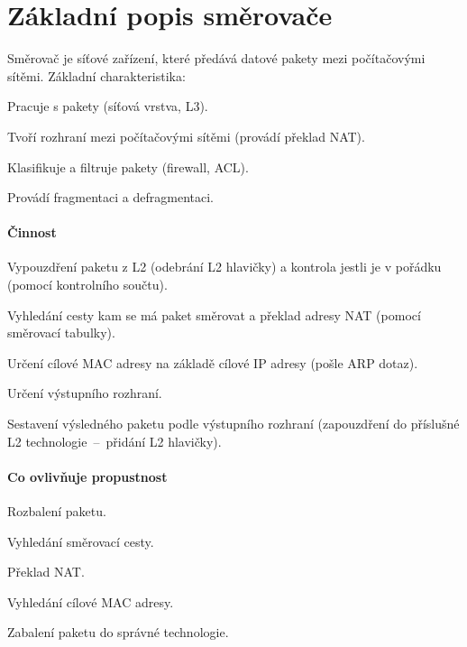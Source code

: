 
\section{Základní popis směrovače}

Směrovač je síťové zařízení, které předává datové pakety mezi počítačovými sítěmi. Základní charakteristika: \begin{compactitem}
    \item Pracuje s pakety (síťová vrstva, L3).
    \item Tvoří rozhraní mezi počítačovými sítěmi (provádí překlad NAT).
    \item Klasifikuje a filtruje pakety (firewall, ACL).
    \item Provádí fragmentaci a defragmentaci.
\end{compactitem}

\paragraph*{Činnost} \begin{compactenum}
    \item Vypouzdření paketu z L2 (odebrání L2 hlavičky) a kontrola jestli je v pořádku (pomocí kontrolního součtu).
    \item Vyhledání cesty kam se má paket směrovat a překlad adresy NAT (pomocí směrovací tabulky).
    \item Určení cílové MAC adresy na základě cílové IP adresy (pošle ARP dotaz).
    \item Určení výstupního rozhraní.
    \item Sestavení výsledného paketu podle výstupního rozhraní (zapouzdření do příslušné L2 technologie~--~přidání L2 hlavičky).
\end{compactenum}

\paragraph*{Co ovlivňuje propustnost} \begin{compactitem}
    \item Rozbalení paketu.
    \item Vyhledání směrovací cesty.
    \item Překlad NAT.
    \item Vyhledání cílové MAC adresy.
    \item Zabalení paketu do správné technologie.
\end{compactitem}

